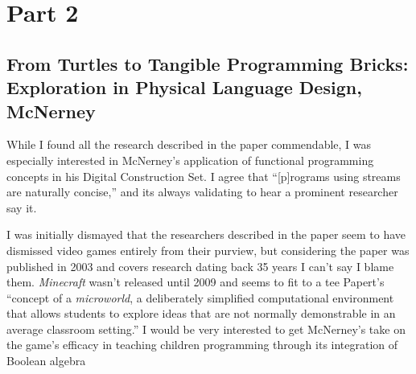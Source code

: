 \documentclass{abrice}
\begin{document}
\section{Part 2}

\subsection{From Turtles to Tangible Programming Bricks: Exploration in Physical
Language Design, McNerney}

While I found all the research described in the paper commendable, I was
especially interested in McNerney's application of functional programming
concepts in his Digital Construction Set. I agree that ``[p]rograms
using streams are naturally concise,'' and its always validating to hear a
prominent researcher say it.

I was initially dismayed that the researchers described in the paper seem to
have dismissed video games entirely from their purview, but considering the
paper was published in 2003 and covers research dating back 35 years I can't say
I blame them. \emph{Minecraft} wasn't released until 2009 and seems to
fit to a tee Papert's ``concept of a \emph{microworld}, a deliberately
simplified computational environment that allows students to explore ideas that
are not normally demonstrable in an average classroom setting.'' I would be very
interested to get McNerney's take on the game's efficacy in teaching children
programming through its integration of Boolean algebra
\end{document}
